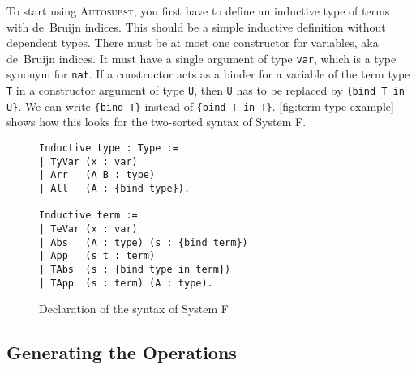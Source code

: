 \documentclass{scrartcl}
\newcommand{\Autosubst}{\textsc{Autosubst}\xspace}
\newcommand{\lst}{\lstinline}
\begin{document}
To start using \Autosubst, you first have to define an inductive type of terms with de~Bruijn indices.
This should be a simple inductive definition without dependent types.
There must be at most one constructor for variables, aka de~Bruijn indices. It must have a single argument of type \lst$var$, which is a type synonym for \lst$nat$.
If a constructor acts as a binder for a variable of the term type \lst$T$ in a constructor argument of type \lst$U$, then \lst$U$ has to be replaced by \lst${bind T in U}$.
We can write \lst${bind T}$ instead of \lst${bind T in T}$.
\autoref{fig:term-type-example} shows how this looks for the two-sorted syntax of System F. 
\begin{figure}
  \centering
  \begin{lstlisting}
Inductive type : Type :=
| TyVar (x : var)
| Arr   (A B : type)
| All   (A : {bind type}).

Inductive term :=
| TeVar (x : var)
| Abs   (A : type) (s : {bind term})
| App   (s t : term)
| TAbs  (s : {bind type in term})
| TApp  (s : term) (A : type).
\end{lstlisting}
  \caption{Declaration of the syntax of System F}
  \label{fig:term-type-example}
\end{figure}

\subsection{Generating the Operations}
\label{sec:gener-oper}
\end{document}

